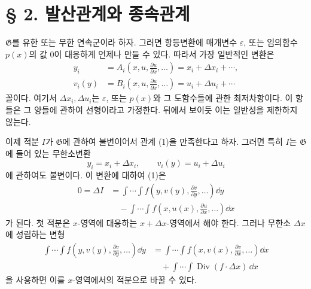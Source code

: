 \bigskip
\section*{§ 2. 발산관계와 종속관계}

\(\mathfrak G\)를 유한 또는 무한 연속군이라 하자. 그러면 항등변환에 매개변수 \(\varepsilon\), 또는 임의함수 \(p(x)\)의 값 0이 대응하게 언제나 만들 수 있다. 따라서 가장 일반적인 변환은
\[
\begin{aligned}
y_i&=A_i\!\left(x,u,\frac{\partial u}{\partial x},\ldots\right)
=x_i+\Delta x_i+\cdots,\\
v_i(y)&=B_i\!\left(x,u,\frac{\partial u}{\partial x},\ldots\right)
=u_i+\Delta u_i+\cdots
\end{aligned}
\]
꼴이다. 여기서 \(\Delta x_i,\Delta u_i\)는 \(\varepsilon\), 또는 \(p(x)\)와 그 도함수들에 관한 최저차항이다. 이 항들은 그 양들에 관하여 선형이라고 가정한다. 뒤에서 보이듯 이는 일반성을 제한하지 않는다.

이제 적분 \(I\)가 \(\mathfrak G\)에 관하여 불변이어서 관계 (1)을 만족한다고 하자. 그러면 특히 \(I\)는 \(\mathfrak G\)에 들어 있는 무한소변환
\[
y_i=x_i+\Delta x_i,\qquad v_i(y)=u_i+\Delta u_i
\]
에 관하여도 불변이다. 이 변환에 대하여 (1)은
\begin{equation}
\tag{7}
\begin{aligned}
0=\Delta I
&=\int\!\cdots\!\int
f\!\left(y,v(y),\frac{\partial v}{\partial y},\ldots\right)\dd y\\
&\quad-\int\!\cdots\!\int
f\!\left(x,u(x),\frac{\partial u}{\partial x},\ldots\right)\dd x
\end{aligned}
\end{equation}
가 된다. 첫 적분은 \(x\)-영역에 대응하는 \(x+\Delta x\)-영역에서 해야 한다. 그러나 무한소 \(\Delta x\)에 성립하는 변형
\begin{equation}
\tag{8}
\begin{aligned}
\int\!\cdots\!\int
f\!\left(y,v(y),\frac{\partial v}{\partial y},\ldots\right)\dd y
&=\int\!\cdots\!\int
f\!\left(x,v(x),\frac{\partial v}{\partial x},\ldots\right)\dd x\\
&\quad+\int\!\cdots\!\int
\operatorname{Div}(f\cdot\Delta x)\,\dd x
\end{aligned}
\end{equation}
을 사용하면 이를 \(x\)-영역에서의 적분으로 바꿀 수 있다.


